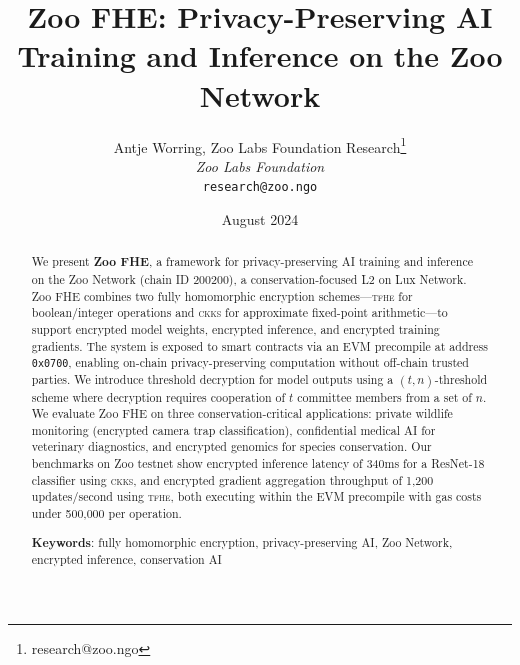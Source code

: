 \documentclass[11pt,letterpaper]{article}
\title{\textbf{Zoo FHE: Privacy-Preserving AI Training and Inference on the Zoo Network}}
\author{
Antje Worring, Zoo Labs Foundation Research\thanks{research@zoo.ngo}\\
\textit{Zoo Labs Foundation}\\
\texttt{research@zoo.ngo}
}
\date{August 2024}
\newcommand{\TFHE}{\textsc{tfhe}}
\newcommand{\CKKS}{\textsc{ckks}}
\begin{document}
\zoocoverpage

\begin{abstract}
We present \textbf{Zoo FHE}, a framework for privacy-preserving AI training and inference on the Zoo Network (chain ID 200200), a conservation-focused L2 on Lux Network. Zoo FHE combines two fully homomorphic encryption schemes---\TFHE{} for boolean/integer operations and \CKKS{} for approximate fixed-point arithmetic---to support encrypted model weights, encrypted inference, and encrypted training gradients. The system is exposed to smart contracts via an EVM precompile at address \texttt{0x0700}, enabling on-chain privacy-preserving computation without off-chain trusted parties. We introduce threshold decryption for model outputs using a $(t, n)$-threshold scheme where decryption requires cooperation of $t$ committee members from a set of $n$. We evaluate Zoo FHE on three conservation-critical applications: private wildlife monitoring (encrypted camera trap classification), confidential medical AI for veterinary diagnostics, and encrypted genomics for species conservation. Our benchmarks on Zoo testnet show encrypted inference latency of 340ms for a ResNet-18 classifier using \CKKS{}, and encrypted gradient aggregation throughput of 1,200 updates/second using \TFHE{}, both executing within the EVM precompile with gas costs under 500,000 per operation.

\textbf{Keywords}: fully homomorphic encryption, privacy-preserving AI, Zoo Network, encrypted inference, conservation AI
\end{abstract}













\end{document}
